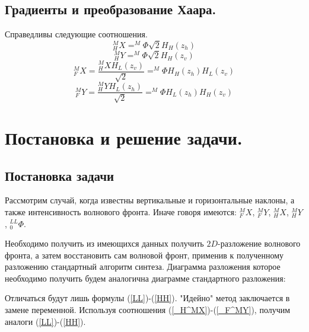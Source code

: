 \documentclass[oneside, final, 14pt]{article}
\begin{document}
\subsection{Градиенты и преобразование Хаара.}
Справедливы следующие соотношения.
\begin{equation}\label{_H^MX}
_H^MX = ^M\Phi\sqrt{2}H_H(z_h) 
\end{equation}
\begin{equation}\label{_H^MY}
_H^MY = ^M\Phi\sqrt{2}H_H(z_v)
\end{equation}
\begin{equation}\label{_F^MX}
_F^MX = \frac{_H^MX H_L(z_v)}{\sqrt{2}}=^M\Phi H_H(z_h) H_L(z_v)
\end{equation}
\begin{equation}\label{_F^MY}
_F^MY = \frac{_H^MY H_L(z_h)}{\sqrt{2}}=^M\Phi H_L(z_h) H_H(z_v)
\end{equation}
\section{Постановка и решение задачи.}
\subsection{Постановка задачи}
Рассмотрим случай, когда известны вертикальные и горизонтальные наклоны, а также интенсивность волнового фронта. Иначе говоря имеются: $_F^MX$, $_F^MY$, $_H^MX$, $_H^MY$ , $_0^{LL}\Phi$.

Необходимо получить из имеющихся данных получить $2D$-разложение волнового фронта, а затем восстановить сам волновой фронт, применив к полученному разложению стандартный алгоритм синтеза.\cite{new_method1}
Диаграмма разложения которое необходимо получить будем аналогична диаграмме стандартного разложения:
\begin{center}
\end{center}
Отличаться будут лишь формулы (\ref{LL})-(\ref{HH}). "Идейно" метод заключается в замене переменной. Используя соотношения (\ref{_H^MX})-(\ref{_F^MY}), получим аналоги (\ref{LL})-(\ref{HH}).
\end{document}
